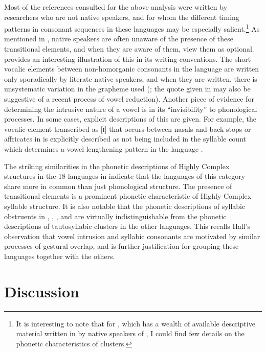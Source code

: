   Most of the references consulted for the above analysis were written by researchers who are not native speakers, and for whom the different timing patterns in consonant sequences in these languages may be especially salient.\footnote{{It is interesting to note that for , which has a wealth of available descriptive material written in  by native speakers of , I could find few details on the phonetic characteristics of clusters.}} As mentioned in , native speakers are often unaware of the presence of these transitional elements, and when they are aware of them, view them as optional.  provides an interesting illustration of this in its writing conventions. The short vocalic elements between non-homorganic consonants in the language are written only sporadically by literate native speakers, and when they are written, there is unsystematic variation in the grapheme used (\citealt[9, 226]{Whitehead2004}; the quote given in  may also be suggestive of a recent process of vowel reduction). Another piece of evidence for determining the intrusive nature of a vowel is in its ``invisibility'' to phonological processes. In some cases, explicit descriptions of this are given. For example, the vocalic element transcribed as [ɪ] that occurs between nasals and back stops or affricates in  is explicitly described as not being included in the syllable count which determines a vowel lengthening pattern in the language \citep[27]{Rose1981}.

  The striking similarities in the phonetic descriptions of Highly Complex structures in the 18 languages in  indicate that the languages of this category share more in common than just phonological structure. The presence of transitional elements is a prominent phonetic characteristic of Highly Complex syllable structure. It is also notable that the phonetic descriptions of syllabic obstruents in , , , and  are virtually indistinguishable from the phonetic descriptions of tautosyllabic clusters in the other languages. This recalls Hall’s observation that vowel intrusion and syllabic consonants are motivated by similar processes of gestural overlap, and is further justification for grouping these languages together with the others.

\section{Discussion}\label{sec:3.5}

